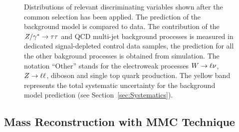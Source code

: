 \begin{figure}[p]
\begin{center}
{	    \label{Ht}	
     }	

    \end{center}
    \caption{Distributions of relevant discriminating variables shown after the common selection has been applied.
	The prediction of the  background model is compared to  data.
	The contribution of the $Z/\gamma^*\rightarrow \tau\tau$ and QCD multi-jet background processes is measured in  dedicated  signal-depleted control data samples,
	the prediction for all the other bakground processes is obtained from simulation.
 	 The notation ``Other'' stands 	for the electroweak processes $W\rightarrow \ell \nu$, $Z\rightarrow \ell \ell$, diboson and single top quark production.
	The yellow band represents the total systematic uncertainty for the background model prediction (see Section~\ref{sec:Systematics}).}
   \label{fig:selections}
\end{figure}




\subsection{Mass Reconstruction with MMC Technique}\label{sec:mmc}


